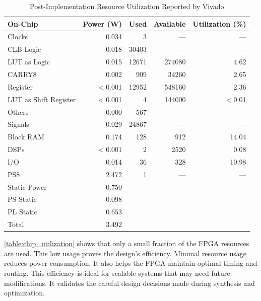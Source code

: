 \begin{table}[ht]
\setlength{\abovecaptionskip}{5pt}    %
\setlength{\belowcaptionskip}{5pt}    %
\centering
\caption{Post-Implementation Resource Utilization Reported by Vivado}
\begin{tabular}{|l|r|r|r|r|}
\hline
On-Chip & Power (W) & Used & Available & Utilization (\%) \\ \hline
Clocks                  & 0.034   & 3     & ---    & ---      \\ \hline
CLB Logic               & 0.018   & 30403 & ---    & ---      \\ \hline
\quad LUT as Logic      & 0.015   & 12671 & 274080 & 4.62     \\ \hline
\quad CARRY8            & 0.002   & 909   & 34260  & 2.65     \\ \hline
\quad Register          & $<$0.001& 12952 & 548160 & 2.36     \\ \hline
\quad LUT as Shift Register & $<$0.001 & 4   & 144000 & $<$0.01 \\ \hline
\quad Others            & 0.000   & 567   & ---    & ---      \\ \hline
Signals                 & 0.029   & 24867 & ---    & ---      \\ \hline
Block RAM               & 0.174   & 128   & 912    & 14.04    \\ \hline
DSPs                    & $<$0.001& 2     & 2520   & 0.08     \\ \hline
I/O                     & 0.014   & 36    & 328    & 10.98    \\ \hline
PS8                     & 2.472   & 1     & ---    & ---      \\ \hline
Static Power            & 0.750   &       &        &          \\ \hline
\quad PS Static         & 0.098   &       &        &          \\ \hline
\quad PL Static         & 0.653   &       &        &          \\ \hline
Total                   & 3.492   &       &        &          \\ \hline
\end{tabular}
\label{table:chip_utilization}
\end{table}

\autoref{table:chip_utilization} shows that only a small fraction of the FPGA resources are used. This low usage proves the design's efficiency. Minimal resource usage reduces power consumption. It also helps the FPGA maintain optimal timing and routing. This efficiency is ideal for scalable systems that may need future modifications. It validates the careful design decisions made during synthesis and optimization.
